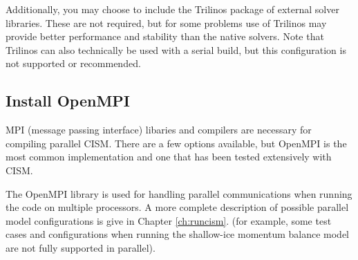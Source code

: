 Additionally, you may choose to include the Trilinos package of external solver libraries.  
These are not required, but for some problems use of Trilinos may provide better
performance and stability than the native solvers.  Note that Trilinos can also technically be 
used with a serial build, but this configuration is not supported or recommended.

\subsection{Install OpenMPI}
MPI (message passing interface) libaries and compilers are necessary for compiling parallel CISM.  
There are a few options available, but OpenMPI is the most common implementation and one that has been 
tested extensively with CISM.

The OpenMPI library is used for handling parallel communications when running the 
code on multiple processors. A more complete description of possible parallel model configurations is give in Chapter \ref{ch:runcism}. 
(for example, some test cases and configurations when running the shallow-ice 
momentum balance model are not fully supported in parallel). 



